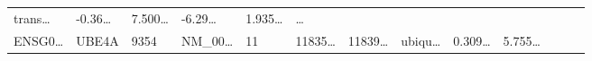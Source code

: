 \documentclass[
]{article}
\begin{document}
\begin{longtable}[]{@{}lllllllllllll@{}}
\begin{minipage}[t]{0.05\columnwidth}
trans\ldots{}\strut
\end{minipage} & \begin{minipage}[t]{0.05\columnwidth}\raggedright
-0.36\ldots{}\strut
\end{minipage} & \begin{minipage}[t]{0.05\columnwidth}\raggedright
7.500\ldots{}\strut
\end{minipage} & \begin{minipage}[t]{0.05\columnwidth}\raggedright
-6.29\ldots{}\strut
\end{minipage} & \begin{minipage}[t]{0.05\columnwidth}\raggedright
1.935\ldots{}\strut
\end{minipage} & \begin{minipage}[t]{0.02\columnwidth}\raggedright
\ldots{}\strut
\end{minipage}\tabularnewline
\begin{minipage}[t]{0.05\columnwidth}\raggedright
ENSG0\ldots{}\strut
\end{minipage} & \begin{minipage}[t]{0.05\columnwidth}\raggedright
UBE4A\strut
\end{minipage} & \begin{minipage}[t]{0.05\columnwidth}\raggedright
9354\strut
\end{minipage} & \begin{minipage}[t]{0.05\columnwidth}\raggedright
NM\_00\ldots{}\strut
\end{minipage} & \begin{minipage}[t]{0.05\columnwidth}\raggedright
11\strut
\end{minipage} & \begin{minipage}[t]{0.05\columnwidth}\raggedright
11835\ldots{}\strut
\end{minipage} & \begin{minipage}[t]{0.05\columnwidth}\raggedright
11839\ldots{}\strut
\end{minipage} & \begin{minipage}[t]{0.05\columnwidth}\raggedright
ubiqu\ldots{}\strut
\end{minipage} & \begin{minipage}[t]{0.05\columnwidth}\raggedright
0.309\ldots{}\strut
\end{minipage} & \begin{minipage}[t]{0.05\columnwidth}\raggedright
5.755\ldots{}\strut
\end{minipage} & \begin{minipage}[t]{0.05\columnwidth}\raggedright

\end{minipage}
\end{longtable}
\end{document}
